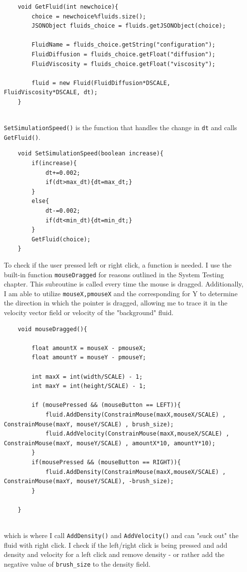 \documentclass[12pt,a4paper]{book}
\begin{document}
\begin{lstlisting}
	void GetFluid(int newchoice){
		choice = newchoice%fluids.size();
		JSONObject fluids_choice = fluids.getJSONObject(choice);
		
		FluidName = fluids_choice.getString("configuration");
		FluidDiffusion = fluids_choice.getFloat("diffusion");
		FluidViscosity = fluids_choice.getFloat("viscosity");
		
		fluid = new Fluid(FluidDiffusion*DSCALE, FluidViscosity*DSCALE, dt);
	}
	
\end{lstlisting}

\verb|SetSimulationSpeed()| is the function that handles the change in \verb|dt| and calls \verb|GetFluid()|.
\begin{lstlisting}
	void SetSimulationSpeed(boolean increase){
		if(increase){
			dt+=0.002;
			if(dt>max_dt){dt=max_dt;}
		}
		else{
			dt-=0.002;
			if(dt<min_dt){dt=min_dt;}
		}
		GetFluid(choice);
	}
\end{lstlisting}
To check if the user pressed left or right click, a function is needed. I use the built-in function \verb|mouseDragged| for reasons outlined in the System Testing chapter. This subroutine is called every time the mouse is dragged. Additionally, I am able to utilize \verb|mouseX,pmouseX| and the corresponding for Y to determine the direction in which the pointer is dragged, allowing me to trace it in the velocity vector field or velocity of the "background" fluid. 
\begin{lstlisting}
	void mouseDragged(){
		
		float amountX = mouseX - pmouseX;
		float amountY = mouseY - pmouseY;
		
		int maxX = int(width/SCALE) - 1;
		int maxY = int(height/SCALE) - 1;
		
		if (mousePressed && (mouseButton == LEFT)){
			fluid.AddDensity(ConstrainMouse(maxX,mouseX/SCALE) , ConstrainMouse(maxY, mouseY/SCALE) , brush_size);
			fluid.AddVelocity(ConstrainMouse(maxX,mouseX/SCALE) , ConstrainMouse(maxY, mouseY/SCALE) , amountX*10, amountY*10);
		}
		if(mousePressed && (mouseButton == RIGHT)){
			fluid.AddDensity(ConstrainMouse(maxX,mouseX/SCALE) , ConstrainMouse(maxY, mouseY/SCALE), -brush_size);
		}
		
	}
	
\end{lstlisting}
which is where I call \verb|AddDensity()| and \verb|AddVelocity()| and can "suck out" the fluid with right click. I check if the left/right click is being pressed and add density and velocity for a left click and remove density - or rather add the negative value of \verb|brush_size| to the density field.
\end{document}
